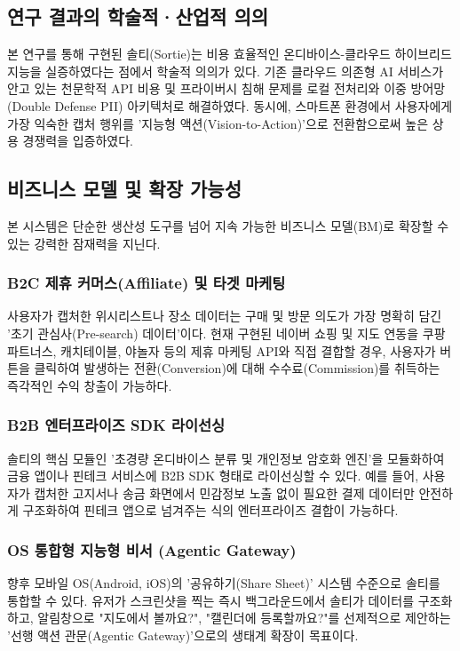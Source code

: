 \documentclass[11pt,a4paper]{article}
\begin{document}
\subsection{연구 결과의 학술적·산업적 의의}

본 연구를 통해 구현된 솔티(Sortie)는 비용 효율적인 온디바이스-클라우드 하이브리드 지능을 실증하였다는 점에서 학술적 의의가 있다. 기존 클라우드 의존형 AI 서비스가 안고 있는 천문학적 API 비용 및 프라이버시 침해 문제를 로컬 전처리와 이중 방어망(Double Defense PII) 아키텍처로 해결하였다. 동시에, 스마트폰 환경에서 사용자에게 가장 익숙한 캡처 행위를 '지능형 액션(Vision-to-Action)'으로 전환함으로써 높은 상용 경쟁력을 입증하였다.

\subsection{비즈니스 모델 및 확장 가능성}

본 시스템은 단순한 생산성 도구를 넘어 지속 가능한 비즈니스 모델(BM)로 확장할 수 있는 강력한 잠재력을 지닌다.

\subsubsection{B2C 제휴 커머스(Affiliate) 및 타겟 마케팅}
사용자가 캡처한 위시리스트나 장소 데이터는 구매 및 방문 의도가 가장 명확히 담긴 '초기 관심사(Pre-search) 데이터'이다. 현재 구현된 네이버 쇼핑 및 지도 연동을 쿠팡 파트너스, 캐치테이블, 야놀자 등의 제휴 마케팅 API와 직접 결합할 경우, 사용자가 버튼을 클릭하여 발생하는 전환(Conversion)에 대해 수수료(Commission)를 취득하는 즉각적인 수익 창출이 가능하다. 

\subsubsection{B2B 엔터프라이즈 SDK 라이선싱}
솔티의 핵심 모듈인 '초경량 온디바이스 분류 및 개인정보 암호화 엔진'을 모듈화하여 금융 앱이나 핀테크 서비스에 B2B SDK 형태로 라이선싱할 수 있다. 예를 들어, 사용자가 캡처한 고지서나 송금 화면에서 민감정보 노출 없이 필요한 결제 데이터만 안전하게 구조화하여 핀테크 앱으로 넘겨주는 식의 엔터프라이즈 결합이 가능하다.

\subsubsection{OS 통합형 지능형 비서 (Agentic Gateway)}
향후 모바일 OS(Android, iOS)의 '공유하기(Share Sheet)' 시스템 수준으로 솔티를 통합할 수 있다. 유저가 스크린샷을 찍는 즉시 백그라운드에서 솔티가 데이터를 구조화하고, 알림창으로 "지도에서 볼까요?", "캘린더에 등록할까요?"를 선제적으로 제안하는 '선행 액션 관문(Agentic Gateway)'으로의 생태계 확장이 목표이다.
\end{document}
